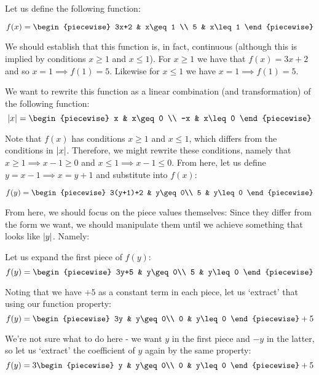 \begin{example}
    Let us define the following function:

    $$
        f(x)=\begin{piecewise}
            3x+2 & x\geq 1 \\
            5 & x\leq 1
        \end{piecewise}
    $$

    We should establish that this function is, in fact, continuous (although this is implied by conditions $x\geq 1$ and $x\leq 1$). For $x\geq 1$ we have that $f(x)=3x+2$ and so $x=1\implies f(1)=5$. Likewise for $x\leq 1$ we have $x=1\implies f(1)=5$.

    We want to rewrite this function as a linear combination (and transformation) of the following function:
    $$
        \abs{x}=\begin{piecewise}
            x & x\geq 0 \\
            -x & x\leq 0
        \end{piecewise}
    $$

    Note that $f(x)$ has conditions $x\geq 1$ and $x\leq 1$, which differs from the conditions in $\abs{x}$. Therefore, we might rewrite these conditions, namely that $x\geq 1\implies x-1\geq 0$ and $x\leq 1\implies x-1\leq 0$. From here, let us define $y=x-1\implies x=y+1$ and substitute into $f(x)$:

    $$
        f(y)=\begin{piecewise}
            3(y+1)+2 & y\geq 0\\
            5 & y\leq 0
        \end{piecewise}
    $$

    From here, we should focus on the piece values themselves: Since they differ from the form we want, we should manipulate them until we achieve something that looks like $\abs{y}$. Namely:

    Let us expand the first piece of $f(y)$:
    $$
        f(y) = \begin{piecewise}
            3y+5 & y\geq 0\\
            5 & y\leq 0
        \end{piecewise}
    $$

    Noting that we have $+5$ as a constant term in each piece, let us `extract' that using our function property:
    $$
        f(y) = \begin{piecewise}
            3y & y\geq 0\\
            0 & y\leq 0
        \end{piecewise}+5
    $$

    We're not sure what to do here - we want $y$ in the first piece and $-y$ in the latter, so let us `extract' the coefficient of $y$ again by the same property:
    $$
        f(y) = 3\begin{piecewise}
            y & y\geq 0\\
            0 & y\leq 0
        \end{piecewise}+5
    $$
    \addtocounter{example}{-1}
\end{example}
